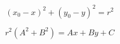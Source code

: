 \documentclass[hyperref,UTF8]{ctexart}
\begin{document}
\[
({x_0}-{x})^2+({y_0}-{y})^2=r^2
\]

\[
{r}^2(A^2+B^2)=Ax+By+C
\]
\end{document}
